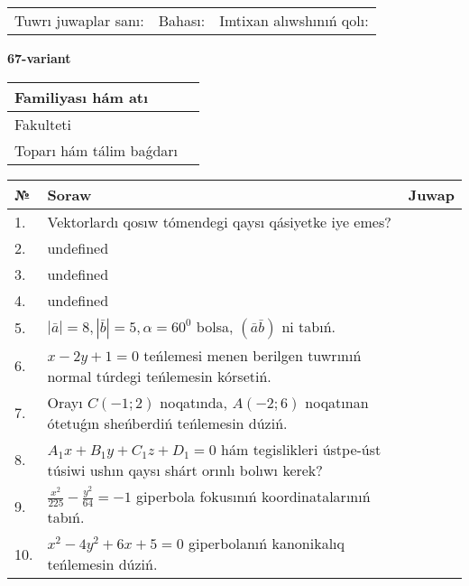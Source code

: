 \documentclass{article}
\begin{document}
\vspace{0.7cm}

\begin{tabular}{lll}
Tuwrı juwaplar sanı: \underline{\hspace{1cm}} & 
Bahası: \underline{\hspace{1cm}} & 
Imtixan alıwshınıń qolı: \underline{\hspace{2cm}} \\
\end{tabular}

\egroup

\newpage


\textbf{67-variant}\\

\bgroup
\def\arraystretch{1.6} %

\begin{tabular}{|m{5.7cm}|m{9.5cm}|}
\hline
Familiyası hám atı & \\
\hline
Fakulteti  & \\
\hline
Toparı hám tálim baǵdarı  & \\
\hline
\end{tabular}

\vspace{0.7cm}

\begin{tabular}{|m{0.7cm}|m{10cm}|m{4cm}|}
\hline
№ & Soraw & Juwap \\
\hline
1. & Vektorlardı qosıw tómendegi qaysı qásiyetke iye emes? &  \\
\hline
2. & undefined &  \\
\hline
3. & undefined &  \\
\hline
4. & undefined &  \\
\hline
5. & \(\left| \bar{a} \right| = 8, \left| \bar{b} \right| = 5, \alpha = 60^{0}\) bolsa, \(( \bar{a}\bar{b} )\) ni tabıń. &  \\
\hline
6. & \(x - 2 y + 1 = 0\) teńlemesi menen berilgen tuwrınıń normal túrdegi teńlemesin kórsetiń. &  \\
\hline
7. & Orayı \(C (- 1;2)\) noqatında, \(A (- 2;6 )\) noqatınan ótetuǵın sheńberdiń teńlemesin dúziń. &  \\
\hline
8. & \(A_{1}x + B_{1}y + C_{1}z + D_{1} = 0\) hám tegislikleri ústpe-úst túsiwi ushın qaysı shárt orınlı bolıwı kerek? &  \\
\hline
9. & \(\frac{x^{2}}{225} - \frac{y^{2}}{64} = - 1\) giperbola fokusınıń koordinatalarınıń tabıń. &  \\
\hline
10. & \(x^{2} - 4 y^{2} + 6 x + 5 = 0\) giperbolanıń kanonikalıq teńlemesin dúziń. & \\
\hline
\end{tabular}
\end{document}
